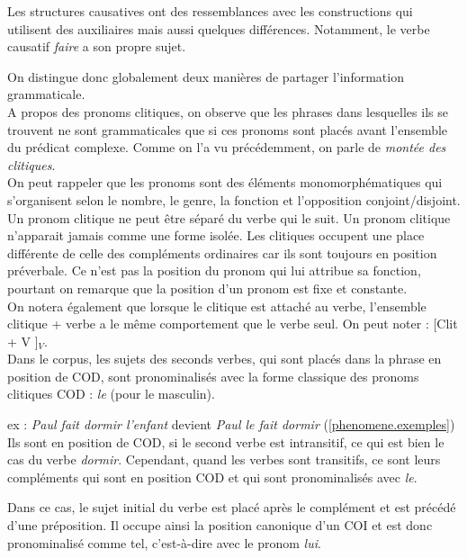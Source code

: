 Les structures causatives ont des ressemblances avec les constructions qui utilisent des auxiliaires mais aussi quelques différences.
Notamment, le verbe causatif \emph{faire} a son propre sujet.

On distingue donc globalement deux manières de partager l'information grammaticale.\\

A propos des pronoms clitiques, on observe que les phrases dans lesquelles ils se trouvent ne sont grammaticales que si ces pronoms sont placés avant l'ensemble du prédicat complexe.
Comme on l'a vu précédemment, on parle de \emph{montée des clitiques}.\\

On peut rappeler que les pronoms sont des éléments monomorphématiques qui s'organisent selon le nombre, le genre, la fonction et l'opposition conjoint/disjoint.
Un pronom clitique ne peut être séparé du verbe qui le suit.
Un pronom clitique n'apparait jamais comme une forme isolée.
Les clitiques occupent une place différente de celle des compléments ordinaires car ils sont toujours en position préverbale.
Ce n'est pas la position du pronom qui lui attribue sa fonction, pourtant on remarque que la position d'un pronom est fixe et constante.\\

On notera également que lorsque le clitique est attaché au verbe, l'ensemble clitique + verbe a le même comportement que le verbe seul.
On peut noter : [Clit + V ]$_V$.\\

Dans le corpus, les sujets des seconds verbes, qui sont placés dans la phrase en position de COD, sont pronominalisés avec la forme classique des pronoms clitiques COD : \emph{le} (pour le masculin).

ex : \emph{Paul fait dormir l'enfant} devient \emph{Paul le fait dormir} (\autoref{phenomene.exemples})\\

Ils sont en position de COD, si le second verbe est intransitif, ce qui est bien le cas du verbe \emph{dormir}.
Cependant, quand les verbes sont transitifs, ce sont leurs compléments qui sont en position COD et qui sont pronominalisés avec \emph{le}.

Dans ce cas, le sujet initial du verbe est placé après le complément et est précédé d'une préposition.
Il occupe ainsi la position canonique d'un COI et est donc pronominalisé comme tel, c'est-à-dire avec le pronom \emph{lui}.

